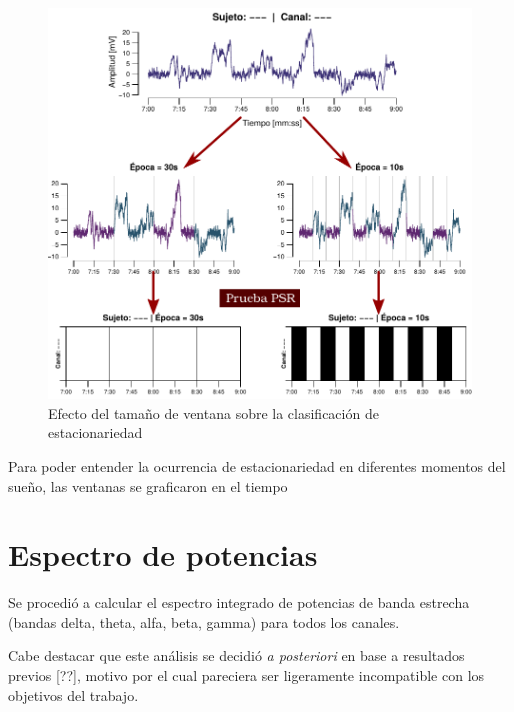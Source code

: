 \begin{figure}
\centering
\includegraphics[width=\linewidth]{./img_diagramas/epocas_diferentes_v2.pdf}
\caption{Efecto del tamaño de ventana sobre la clasificación de estacionariedad}
\label{epocas_diferentes}
\end{figure}

Para poder entender la ocurrencia de estacionariedad en diferentes momentos del sueño, las ventanas
se graficaron en el tiempo 

\section{Espectro de potencias}

Se procedió a calcular el espectro integrado de potencias de banda estrecha (bandas delta, theta,
alfa, beta, gamma) para todos los canales.

Cabe destacar que este análisis se decidió \textit{a posteriori} en base a resultados previos [??],
motivo por el cual pareciera ser ligeramente incompatible con los objetivos del trabajo.


